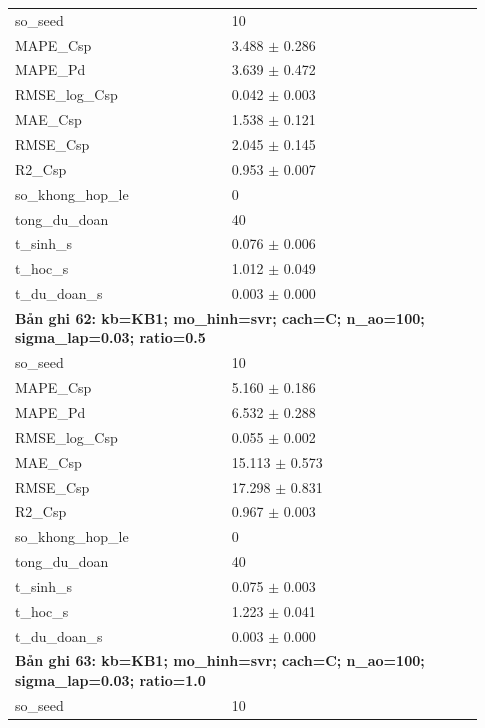 \begin{longtable}{p{0.43\linewidth}p{0.50\linewidth}}
so\_\allowbreak seed & 10 \\
MAPE\_\allowbreak Csp & 3.488 $\pm$ 0.286 \\
MAPE\_\allowbreak Pd & 3.639 $\pm$ 0.472 \\
RMSE\_\allowbreak log\_\allowbreak Csp & 0.042 $\pm$ 0.003 \\
MAE\_\allowbreak Csp & 1.538 $\pm$ 0.121 \\
RMSE\_\allowbreak Csp & 2.045 $\pm$ 0.145 \\
R2\_\allowbreak Csp & 0.953 $\pm$ 0.007 \\
so\_\allowbreak khong\_\allowbreak hop\_\allowbreak le & 0 \\
tong\_\allowbreak du\_\allowbreak doan & 40 \\
t\_\allowbreak sinh\_\allowbreak s & 0.076 $\pm$ 0.006 \\
t\_\allowbreak hoc\_\allowbreak s & 1.012 $\pm$ 0.049 \\
t\_\allowbreak du\_\allowbreak doan\_\allowbreak s & 0.003 $\pm$ 0.000 \\
\midrule
\multicolumn{2}{p{0.95\linewidth}}{\textbf{Bản ghi 62: kb=KB1; mo\_hinh=svr; cach=C; n\_ao=100; sigma\_lap=0.03; ratio=0.5}} \\
so\_\allowbreak seed & 10 \\
MAPE\_\allowbreak Csp & 5.160 $\pm$ 0.186 \\
MAPE\_\allowbreak Pd & 6.532 $\pm$ 0.288 \\
RMSE\_\allowbreak log\_\allowbreak Csp & 0.055 $\pm$ 0.002 \\
MAE\_\allowbreak Csp & 15.113 $\pm$ 0.573 \\
RMSE\_\allowbreak Csp & 17.298 $\pm$ 0.831 \\
R2\_\allowbreak Csp & 0.967 $\pm$ 0.003 \\
so\_\allowbreak khong\_\allowbreak hop\_\allowbreak le & 0 \\
tong\_\allowbreak du\_\allowbreak doan & 40 \\
t\_\allowbreak sinh\_\allowbreak s & 0.075 $\pm$ 0.003 \\
t\_\allowbreak hoc\_\allowbreak s & 1.223 $\pm$ 0.041 \\
t\_\allowbreak du\_\allowbreak doan\_\allowbreak s & 0.003 $\pm$ 0.000 \\
\midrule
\multicolumn{2}{p{0.95\linewidth}}{\textbf{Bản ghi 63: kb=KB1; mo\_hinh=svr; cach=C; n\_ao=100; sigma\_lap=0.03; ratio=1.0}} \\
so\_\allowbreak seed & 10 \\

\end{longtable}
